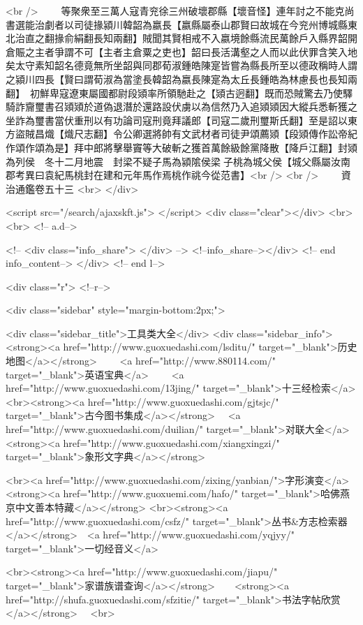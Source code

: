 <br />
　　等聚衆至三萬人寇青兖徐三州破壞郡縣【壞音怪】連年討之不能克尚書選能治劇者以司徒掾潁川韓韶為嬴長【嬴縣屬泰山郡賢曰故城在今兖州博城縣東北治直之翻掾俞絹翻長知兩翻】賊聞其賢相戒不入嬴境餘縣流民萬餘戶入縣界韶開倉賑之主者爭謂不可【主者主倉粟之吏也】韶曰長活溝壑之人而以此伏罪含笑入地矣太守素知韶名德竟無所坐韶與同郡荀淑鍾皓陳寔皆嘗為縣長所至以德政稱時人謂之潁川四長【賢曰謂荀淑為當塗長韓韶為嬴長陳寔為太丘長鍾皓為林慮長也長知兩翻】　初鮮卑寇遼東屬國都尉段熲率所領馳赴之【熲古迥翻】既而恐賊驚去乃使驛騎詐齎璽書召熲熲於道偽退潛於還路設伏虜以為信然乃入追熲熲因大縱兵悉斬獲之坐詐為璽書當伏重刑以有功論司寇刑竟拜議郎【司寇二歲刑璽斯氏翻】至是詔以東方盜賊昌熾【熾尺志翻】令公卿選將帥有文武材者司徒尹頌薦熲【段熲傳作訟帝紀作頌作頌為是】拜中郎將擊舉竇等大破斬之獲首萬餘級餘黨降散【降戶江翻】封熲為列侯　冬十二月地震　封梁不疑子馬為潁隂侯梁子桃為城父侯【城父縣屬汝南郡考異曰袁紀馬桃封在建和元年馬作焉桃作祧今從范書】<br />
<br />
　　資治通鑑卷五十三  <br>
   </div> 

<script src="/search/ajaxskft.js"> </script>
 <div class="clear"></div>
<br>
<br>
 <!-- a.d-->

 <!--
<div class="info_share">
</div> 
-->
 <!--info_share--></div>   <!-- end info_content-->
  </div> <!-- end l-->

<div class="r">   <!--r-->



<div class="sidebar"  style="margin-bottom:2px;">

 
<div class="sidebar_title">工具类大全</div>
<div class="sidebar_info">
<strong><a href="http://www.guoxuedashi.com/lsditu/" target="_blank">历史地图</a></strong>　　
<a href="http://www.880114.com/" target="_blank">英语宝典</a>　　
<a href="http://www.guoxuedashi.com/13jing/" target="_blank">十三经检索</a>　
<br><strong><a href="http://www.guoxuedashi.com/gjtsjc/" target="_blank">古今图书集成</a></strong>　
<a href="http://www.guoxuedashi.com/duilian/" target="_blank">对联大全</a>　<strong><a href="http://www.guoxuedashi.com/xiangxingzi/" target="_blank">象形文字典</a></strong>　

<br><a href="http://www.guoxuedashi.com/zixing/yanbian/">字形演变</a>　　<strong><a href="http://www.guoxuemi.com/hafo/" target="_blank">哈佛燕京中文善本特藏</a></strong>
<br><strong><a href="http://www.guoxuedashi.com/csfz/" target="_blank">丛书&方志检索器</a></strong>　<a href="http://www.guoxuedashi.com/yqjyy/" target="_blank">一切经音义</a>　　

<br><strong><a href="http://www.guoxuedashi.com/jiapu/" target="_blank">家谱族谱查询</a></strong>　　<strong><a href="http://shufa.guoxuedashi.com/sfzitie/" target="_blank">书法字帖欣赏</a></strong>　
<br>

